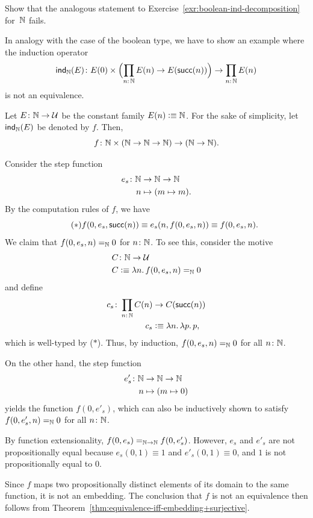 \begin{exr}
    Show that the analogous statement to\/ {\upshape Exercise~\ref{exr:boolean-ind-decomposition}} for\/~$\mathbb{N}$ fails.
\end{exr}

\begin{solution}
    In analogy with the case of the boolean type, we have to show an example where the induction operator
    \[
        \fun{ind}_\N(E)\colon
            E(0)\times
                \Bigl(
                    \prod_{n\colon\N}
                        E(n)\to E(\fun{succ}(n))
                \Bigr)
                \to\prod_{n\colon\N}E(n)
    \]
    is not an equivalence.

    Let $E\colon\N\to\univ$ be the constant family $E(n)\mathrel{\vcentcolon}\equiv\mathbb{N}$. For the sake of simplicity, let $\mathsf{ind}_{\mathbb{N}}(E)$ be denoted by $f$. Then,
    \[
        f\colon\N\times(\N\to\N\to\N)\to(\N\to\N).
    \]

    Consider the step function
    \begin{align*}
        e_s\colon\N&\to\N\to\N\\
        n&\mapsto(m\mapsto m).
    \end{align*}
    By the computation rules of $f$, we have
    \[\tag{$\ast$}
        f(0,e_s,\mathsf{succ}(n))
            \equiv e_s(n,f(0,e_s,n))
            \equiv f(0,e_s,n).
    \]
    We claim that $f(0,e_s,n)\mathrel{=_{\mathbb{N}}}0$ for $n\colon\N$. To see this, consider the motive
    \begin{align*}
        C&\colon\N\to\univ\\
        C&\defeq\lambda n.\,f(0,e_s,n)\eq\N0
    \end{align*}
    and define
    \begin{align*}
        c_s\colon\prod_{n\colon\N}C(n)
            &\to C(\fun{succ}(n))\\
        c_s&\defeq\lambda n.\,\lambda p.\,p,
    \end{align*}
    which is well-typed by ($\ast$). Thus, by induction, $f(0,e_s,n)\mathrel{=_{\mathbb{N}}}0$ for all $n\colon\N$.

    On the other hand, the step function
    \begin{align*}
        e'_s\colon\N&\to\N\to\N\\
        n&\mapsto(m\mapsto0)
    \end{align*}
    yields the function $f(0,e'_s)$, which can also be inductively shown to satisfy $f(0,e'_s,n)\mathrel{=_{\mathbb{N}}}0$ for all $n\colon\N$.

    By function extensionality, $f(0,e_s)\mathrel{=_{\mathbb{N}\to\mathbb{N}}}f(0,e'_s)$. However, $e_s$ and $e'_s$ are not propositionally equal because $e_s(0,1)\equiv1$ and $e'_s(0,1)\equiv0$, and $1$ is not propositionally equal to $0$.

    Since $f$ maps two propositionally distinct elements of its domain to the same function, it is not an embedding. The conclusion that $f$ is not an equivalence then follows from Theorem~\ref{thm:equivalence-iff-embedding+surjective}.
    
\end{solution}

